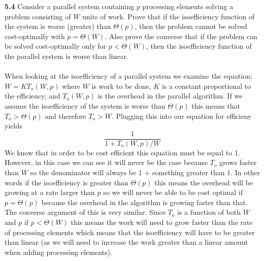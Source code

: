 \documentclass[11pt]{article}
\begin{document}
 {\bf 5.4} Consider a parallel system containing $p$ processing
 elements solving a problem consisting of $W$ units of work. Prove
 that if the isoefficiency function of the system is worse
 (greater) than $\Theta(p)$, then the problem cannot be solved
 cost-optimally with $p = \Theta(W)$. Also prove the converse that if
 the problem can be solved cost-optimally only for $p < \Theta(W)$,
 then the isoefficiency function of the parallel system is worse
 than linear.\\\\
 When looking at the isoefficiency of a parallel system we examine
 the equation: $W = KT_o(W,p)$ where $W$ is work to be done, $K$
 is a constant proportional to the efficiency, and $T_o(W,p)$ is
 the overhead in the parallel algorithm. If we assume the
 isoefficiency of the system is worse than $\Theta(p)$ this means
 that $T_o > \Theta(p)$ and therefore $T_o > W$.
 Plugging this into our equation for efficieny yields
 $$ \frac{1}{1 + T_o(W,p) / W}$$
 We know that in order to be cost efficient this equation must be
 equal to 1. However, in this case we can see it will never be the
 case because $T_o$ grows faster than $W$ so the denominator will
 always be 1 + something greater than 1. In other words
 if the isoefficiency is greater than $\Theta(p)$ this means the
 overhead will be growing at a rate larger than $p$ so we will
 never be able to be cost optimal if $p = \Theta(p)$ because the
 overhead in the algorithm is growing faster than that. The
 converse argument of this is very similar. Since $T_o$ is a
 function of both $W$ and $p$ if $p < \Theta(W)$ this means the
 work will need to grow faster than the rate of processing
 elements which means that the isoefficiency will have to be
 greater than linear (as we will need to increase the work greater
 than a linear amount when adding processing elements).\\
\end{document}

